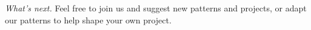 \begin{framed}
\noindent \emph{What's next.}  Feel free to join us and suggest new patterns and
projects, or adapt our patterns to help shape your own
 project.
\end{framed}

\endgroup
